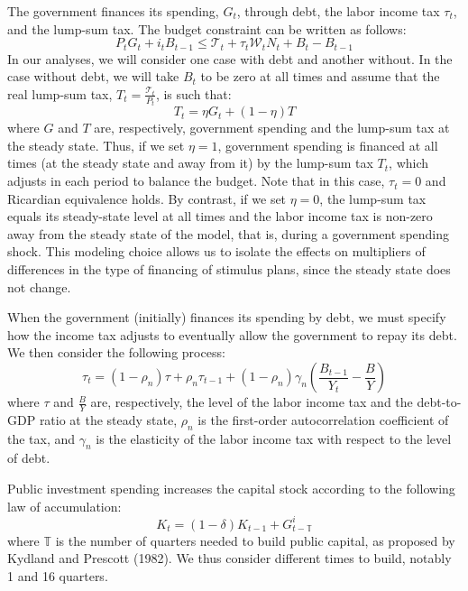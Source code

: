 \documentclass[12pt,letterpaper]{article}
\newcommand{\T}{\mathbb{T}}
\newcommand{\WW}{\mathcal{W}}
\newcommand{\TT}{\mathcal{T}}
\begin{document}
The government finances its spending, $G_t$, through debt, the labor income tax $\tau_t$, and the lump-sum tax. The budget constraint can be written as follows:
\begin{equation}
P_t G_t + i_t B_{t-1} \leq \TT_t + \tau_t \WW_t N_t + B_t - B_{t-1} \tag{16}
\end{equation}
In our analyses, we will consider one case with debt and another without. In the case without debt, we will take $B_t$ to be zero at all times and assume that the real lump-sum tax, $T_t = \frac{\TT_t}{P_t}$, is such that:
\begin{equation}
T_t = \eta G_t + (1-\eta)T \tag{17}
\end{equation}
where $G$ and $T$ are, respectively, government spending and the lump-sum tax at the steady state. Thus, if we set $\eta = 1$, government spending is financed at all times (at the steady state and away from it) by the lump-sum tax $T_t$, which adjusts in each period to balance the budget. Note that in this case, $\tau_t = 0$ and Ricardian equivalence holds. By contrast, if we set $\eta = 0$, the lump-sum tax equals its steady-state level at all times and the labor income tax is non-zero away from the steady state of the model, that is, during a government spending shock. This modeling choice allows us to isolate the effects on multipliers of differences in the type of financing of stimulus plans, since the steady state does not change.

When the government (initially) finances its spending by debt, we must specify how the income tax adjusts to eventually allow the government to repay its debt. We then consider the following process:
\begin{equation}
\tau_t = (1-\rho_n)\tau + \rho_n \tau_{t-1} + (1-\rho_n)\gamma_n\left(\frac{B_{t-1}}{Y_t} - \frac{B}{Y}\right) \tag{18}
\end{equation}
where $\tau$ and $\frac{B}{Y}$ are, respectively, the level of the labor income tax and the debt-to-GDP ratio at the steady state, $\rho_n$ is the first-order autocorrelation coefficient of the tax, and $\gamma_n$ is the elasticity of the labor income tax with respect to the level of debt.

Public investment spending increases the capital stock according to the following law of accumulation:
\begin{equation}
K_t = (1-\delta)K_{t-1} + G^i_{t-\T} \tag{19}
\end{equation}
where $\T$ is the number of quarters needed to build public capital, as proposed by Kydland and Prescott (1982). We thus consider different times to build, notably 1 and 16 quarters.
\end{document}
